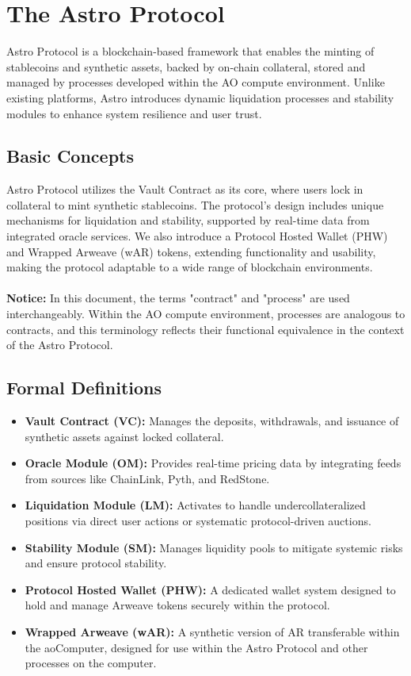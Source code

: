 \section{The Astro Protocol}
Astro Protocol is a blockchain-based framework that enables the minting of stablecoins and synthetic assets, backed by on-chain collateral, stored and managed by processes developed within the AO compute environment. Unlike existing platforms, Astro introduces dynamic liquidation processes and stability modules to enhance system resilience and user trust.

\subsection{Basic Concepts}
Astro Protocol utilizes the Vault Contract as its core, where users lock in collateral to mint synthetic stablecoins. The protocol's design includes unique mechanisms for liquidation and stability, supported by real-time data from integrated oracle services. We also introduce a Protocol Hosted Wallet (PHW) and Wrapped Arweave (wAR) tokens, extending functionality and usability, making the protocol adaptable to a wide range of blockchain environments.\\\\


\noindent\textbf{Notice:} In this document, the terms "contract" and "process" are used interchangeably. Within the AO compute environment, processes are analogous to contracts, and this terminology reflects their functional equivalence in the context of the Astro Protocol.\\

\subsection{Formal Definitions}
\begin{itemize}
    \item \textbf{Vault Contract (VC):} Manages the deposits, withdrawals, and issuance of synthetic assets against locked collateral.
    \item \textbf{Oracle Module (OM):} Provides real-time pricing data by integrating feeds from sources like ChainLink, Pyth, and RedStone.
    \item \textbf{Liquidation Module (LM):} Activates to handle undercollateralized positions via direct user actions or systematic protocol-driven auctions.
    \item \textbf{Stability Module (SM):} Manages liquidity pools to mitigate systemic risks and ensure protocol stability.
    \item \textbf{Protocol Hosted Wallet (PHW):} A dedicated wallet system designed to hold and manage Arweave tokens securely within the protocol.
    \item \textbf{Wrapped Arweave (wAR):} A synthetic version of AR transferable within the aoComputer, designed for use within the Astro Protocol and other processes on the computer.
\end{itemize}

